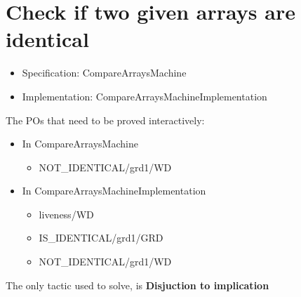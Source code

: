 \section{Check if  two given arrays are identical}

\begin{itemize}
\item Specification: CompareArraysMachine
\item Implementation: CompareArraysMachineImplementation
\end{itemize}

The POs that need to be proved interactively:
\begin{itemize}
\item In CompareArraysMachine
\begin{itemize}
\item NOT\_IDENTICAL/grd1/WD
\end{itemize}
\item In CompareArraysMachineImplementation
\begin{itemize}
\item liveness/WD
\item IS\_IDENTICAL/grd1/GRD
\item NOT\_IDENTICAL/grd1/WD
\end{itemize}
\end{itemize}

The only tactic used to solve, is \textbf{Disjuction to implication} 